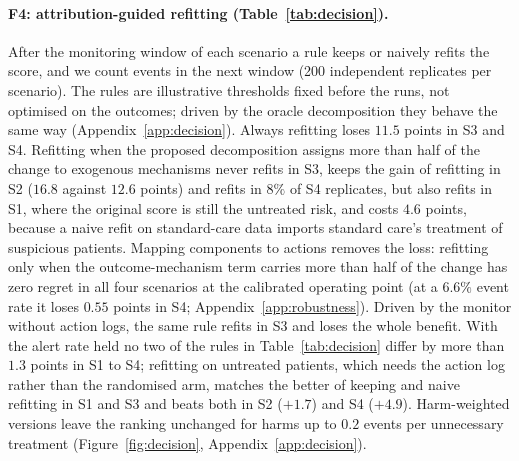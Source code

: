 \documentclass[letterpaper]{article} %
\begin{document}
\paragraph{F4: attribution-guided refitting (Table~\ref{tab:decision}).}
After the monitoring window of each scenario a rule keeps or naively refits
the score, and we count events in the next window (200 independent replicates
per scenario). The rules are illustrative thresholds fixed before the runs,
not optimised on the outcomes; driven by the oracle decomposition they behave
the same way (Appendix~\ref{app:decision}). Always refitting loses $11.5$ points in S3 and S4. Refitting
when the proposed decomposition assigns more than half of the change to
exogenous mechanisms never refits in S3, keeps the gain of refitting in S2
($16.8$ against $12.6$ points) and refits in $8\%$ of S4 replicates, but also
refits in S1, where the original
score is still the untreated risk, and costs $4.6$ points, because a naive
refit on standard-care data imports standard care's treatment of suspicious
patients. Mapping components to actions removes the loss: refitting only when
the outcome-mechanism term carries more than half of the change has zero
regret in all four scenarios at the calibrated operating point (at a $6.6\%$
event rate it loses $0.55$ points in S4; Appendix~\ref{app:robustness}).
Driven by the monitor without action logs, the same rule refits in S3 and
loses the whole benefit. With the alert rate held no two of the rules in
Table~\ref{tab:decision} differ by more than
$1.3$ points in S1 to S4; refitting on untreated patients, which needs
the action log rather than the randomised arm, matches the better of keeping
and naive refitting in S1 and S3 and beats both in S2 ($+1.7$) and S4
($+4.9$). Harm-weighted versions leave the ranking unchanged for harms up to
$0.2$ events per unnecessary treatment (Figure~\ref{fig:decision},
Appendix~\ref{app:decision}).
\end{document}
